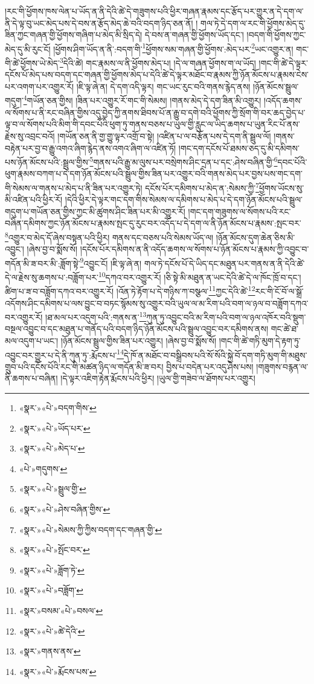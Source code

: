 །རང་གི་ཕྱོགས་ཁས་ལེན་པ་ཡོད་ན་ནི་དེའི་ཚེ་དེ་གཟུགས་པའི་ཕྱིར་གཞན་རྣམས་དང་རྩོད་པར་གྱུར་ན་དེ་དག་ལ་ནི་དེ་ལྟ་བུ་ཡང་མེད་པས་དེ་བས་ན་རྩོད་མེད་ཆེ་བའི་བདག་ཉིད་ཅན་ནོ། །
གལ་ཏེ་དེ་དག་ལ་རང་གི་ཕྱོགས་མེད་དུ་ཟིན་ཀྱང་གཞན་གྱི་ཕྱོགས་གཞིག་པ་མེད་མི་སྲིད་དེ། དེ་བས་ན་གཞན་གྱི་ཕྱོགས་ཡོད་དང་། །བདག་གི་ཕྱོགས་ཀྱང་མེད་དུ་མི་རུང་ངོ། །ཕྱོགས་ཤིག་ཡོད་ན་ནི་:བདག་གི་\footnote{«སྣར་»«པེ་»བདག་གིས་}ཕྱོགས་སམ་གཞན་གྱི་ཕྱོགས་:མེད་པར་\footnote{«སྣར་»«པེ་»ཡོད་པར་}ཡང་འགྱུར་ན། གང་གི་ཚེ་ཕྱོགས་ཡེ་མེད་\footnote{«སྣར་»«པེ་»མེད་པ་}དེའི་ཚེ། གང་རྣམས་ལ་ནི་ཕྱོགས་མེད་པ། །དེ་ལ་གཞན་ཕྱོགས་ག་ལ་ཡོད། །གང་གི་ཚེ་དེ་ལྟར་དངོས་པོ་མེད་པས་བདག་དང་གཞན་གྱི་ཕྱོགས་མེད་པ་དེའི་ཚེ་དེ་ལྟར་མཐོང་བ་རྣམས་ཀྱི་ཉོན་མོངས་པ་རྣམས་ངེས་པར་འགག་པར་འགྱུར་རོ། །ཇི་ལྟ་ཞེ་ན། དེ་དག་འདི་ལྟར། གང་ཡང་རུང་བའི་གནས་རྙེད་ནས། །ཉོན་མོངས་སྦྲུལ་གདུག་\footnote{«པེ་»གདུགས་}གཡོན་ཅན་གྱིས། །ཟིན་པར་འགྱུར་རོ་གང་གི་སེམས། །གནས་མེད་དེ་དག་ཟིན་མི་འགྱུར། །འདོད་ཆགས་ལ་སོགས་པ་ནི་རང་བཞིན་གྱིས་འདུ་བྱེད་ཀྱི་ནགས་ཐིབས་པོ་ན་རྒྱུ་བ་དགེ་བའི་ཕྱོགས་ཀྱི་སྲོག་གི་བར་ཆད་བྱེད་པ་ལྟ་བ་ལ་སོགས་པའི་མིག་གི་དབང་པོའི་ཕུག་ཏུ་གནས་བཅས་པ་ཡུལ་གྱི་རླུང་ལ་ཡིད་ཆགས་པ་ཡུན་རིང་པོ་ནས་རྗེས་སུ་འབྲང་བའོ། །གཡོན་ཅན་ནི་གྱ་གྱུ་ལྟར་འགྲོ་བ་སྟེ། །འཛིན་པ་ལ་བརྩོན་པས་དེ་དག་ནི་སྦྲུལ་ལོ། །གནས་བརྟེན་པར་བྱ་བ་རྒྱུ་འགའ་ཞིག་རྙེད་ནས་འགའ་ཞིག་ལ་འཛིན་ཏོ། །གང་དག་དངོས་པོ་ཐམས་ཅད་དུ་མི་དམིགས་པས་ཉོན་མོངས་པའི་:སྦྲུལ་གྱིས་\footnote{«སྣར་»«པེ་»སྦྲུལ་གྱི་}གནས་པའི་རྒྱུ་མ་ལུས་པར་བསྲེགས་ཤིང་དྲན་པ་དང་:ཤེས་བཞིན་གྱི་\footnote{«སྣར་»«པེ་»ཤེས་བཞིན་གྱིས་}དབང་པོའི་ཕུག་རྣམས་བཀག་པ་དེ་དག་ཉོན་མོངས་པའི་སྦྲུལ་གྱིས་ཟིན་པར་འགྱུར་བའི་གནས་མེད་པར་བྱས་པས་གང་དག་གི་སེམས་ལ་གནས་པ་མེད་པ་ནི་ཟིན་པར་འགྱུར་ཏེ། དངོས་པོར་དམིགས་པ་མེད་ན་:སེམས་ཀྱི་\footnote{«སྣར་»«པེ་»སེམས་ཀྱི་ཀྱིས་བདག་དང་གཞན་གྱི་}ཕྱོགས་ཡོངས་སུ་མི་འཛིན་པའི་ཕྱིར་རོ། །དེའི་ཕྱིར་དེ་ལྟར་གང་དག་གིས་སེམས་ལ་དམིགས་པ་མེད་པ་དེ་དག་ཉོན་མོངས་པའི་སྦྲུལ་གདུག་པ་གཡོན་ཅན་གྱིས་ཀྱང་མི་ཚུགས་ཤིང་ཟིན་པར་མི་འགྱུར་རོ། །གང་དག་གཟུགས་ལ་སོགས་པའི་རང་བཞིན་དམིགས་ཀྱང་ཉོན་མོངས་པ་རྣམས་སྤང་དུ་རུང་བར་འདོད་པ་དེ་དག་ལ་ནི་ཉོན་མོངས་པ་རྣམས་:སྤང་བར་\footnote{«སྣར་»«པེ་»སྤོང་བར་}འགྱུར་བ་མེད་དོ་ཞེས་བསྟན་པའི་ཕྱིར། གནས་དང་བཅས་པའི་སེམས་ཡོད་ལ། །ཉོན་མོངས་དུག་ཆེན་ཅིས་མི་འབྱུང་། །ཞེས་བྱ་བ་སྨོས་སོ། །དངོས་པོར་དམིགས་ན་ནི་འདོད་ཆགས་ལ་སོགས་པ་ཉོན་མོངས་པ་རྣམས་ཀྱི་འབྱུང་བ་གདོན་མི་ཟ་བར་མི་:ཟློག་སྟེ་\footnote{«སྣར་»«པེ་»ཟློག་ཏེ་}འབྱུང་ངོ། །ཇི་ལྟ་ཞེ་ན། གལ་ཏེ་དངོས་པོ་དེ་ཡིད་དང་མཐུན་པར་གནས་ན་ནི་དེའི་ཚེ་དེ་ལ་རྗེས་སུ་ཆགས་པ་:བཟློག་པར་\footnote{«སྣར་»«པེ་»བཟློག་}དཀའ་བར་འགྱུར་རོ། །ཅི་སྟེ་མི་མཐུན་ན་ཡང་དེའི་ཚེ་དེ་ལ་ཁོང་ཁྲོ་བ་དང་། ཚིག་པ་ཟ་བ་བཟློག་དཀའ་བར་འགྱུར་རོ། །འོན་ཏེ་རྟོག་པ་དེ་གཉིས་ཀ་བསྩལ་\footnote{«སྣར་»བསམ་«པེ་»བསལ་}ཀྱང་དེའི་ཚེ་\footnote{«སྣར་»«པེ་»ཚེ་དེའི་}རང་གི་ངོ་བོ་ལ་སྒྲོ་འདོགས་ཤིང་དམིགས་པ་ལས་བྱུང་བ་བཏང་སྙོམས་སུ་འགྱུར་བའི་ཡུལ་ལ་མ་རིག་པའི་བག་ལ་ཉལ་བ་བཟློག་དཀའ་བར་འགྱུར་རོ། །ཐ་མལ་པར་འདུག་པའི་:གནས་ན་\footnote{«སྣར་»གནས་ནས་}ཀུན་ཏུ་འབྱུང་བའི་མ་རིག་པའི་བག་ལ་ཉལ་འཁོར་བའི་སྡུག་བསྔལ་འབྱུང་བ་དང་མཐུན་པ་གནོད་པའི་བདག་ཉིད་ཉོན་མོངས་པའི་སྦྲུལ་འབྱུང་བར་དམིགས་ནས། གང་ཚེ་ཐ་མལ་འདུག་པ་ཡང་། །ཉོན་མོངས་སྦྲུལ་གྱིས་ཟིན་པར་འགྱུར། །ཞེས་བྱ་བ་སྨོས་སོ། །གང་གི་ཚེ་གཏི་མུག་དེ་རྟག་ཏུ་འབྱུང་བར་གྱུར་པ་དེ་ནི་ཀུན་ཏུ་:རྨོངས་པ་\footnote{«སྣར་»«པེ་»རྨོངས་པས་}དེ་ཁོ་ན་མཐོང་བ་བསྒྲིབས་པའི་སོ་སོའི་སྐྱེ་བོ་དག་གཏི་མུག་གི་མཐུས་གྲུབ་པའི་དངོས་པོའི་རང་གི་མཚན་ཉིད་ལ་གདོན་མི་ཟ་བར། བྱིས་པ་བདེན་པར་འདུ་ཤེས་པས། །གཟུགས་བརྙན་ལ་ནི་ཆགས་པ་བཞིན། །དེ་ལྟར་འཇིག་རྟེན་རྨོངས་པའི་ཕྱིར། །ཡུལ་གྱི་གཟེབ་ལ་ཐོགས་པར་འགྱུར། 